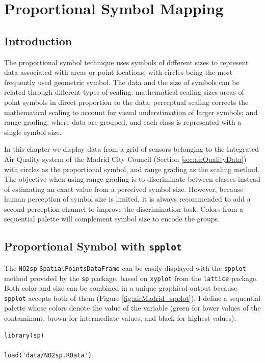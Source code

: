 
\section{Proportional Symbol Mapping}
\label{sec-1}
\label{sec:bubble}
\subsection{Introduction}
\label{sec-1-1}
The proportional symbol technique uses symbols of different sizes
to represent data associated with areas or point locations, with
circles being the most frequently used geometric symbol. The data
and the size of symbols can be related through different types of
scaling: mathematical scaling sizes areas of point symbols in
direct proportion to the data; perceptual scaling corrects the
mathematical scaling to account for visual understimation of
larger symbols; and range grading, where data are grouped, and each
class is represented with a single symbol size. 

In this chapter we display data from a grid of sensors belonging to
the Integrated Air Quality system of the Madrid City Council (Section
\ref{sec:airQualityData}) with circles as the proportional symbol, and
range grading as the scaling method. The objective when using range
grading is to discriminate between classes instead of estimating an
exact value from a perceived symbol size. However, because human
perception of symbol size is limited, it is always recommended to
add a second perception channel to improve the discrimination
task. Colors from a sequential palette will complement symbol size to
encode the groups.

\subsection{Proportional Symbol with \texttt{spplot}}
\label{sec-1-2}
The \texttt{NO2sp} \texttt{SpatialPointsDataFrame} can be easily displayed
with the \texttt{spplot} method provided by the \texttt{sp} package, based on
\texttt{xyplot} from the \texttt{lattice} package. Both color and size can be
combined in a unique graphical output because \texttt{spplot} accepts
both of them (Figure \ref{fig:airMadrid_spplot}). I define a
sequential palette whose colors denote the value of the variable
(green for lower values of the contaminant, brown for intermediate
values, and black for highest values).

\lstset{language=R,numbers=none}
\begin{lstlisting}
library(sp)

load('data/NO2sp.RData')
\end{lstlisting}

